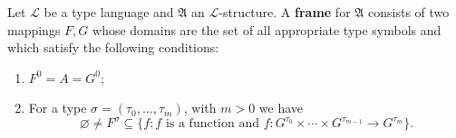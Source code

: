 Let $\mathcal{L}$ be a type language and $\mathfrak{A}$ an $\mathcal{L}$-structure. A \textbf{frame} for $\mathfrak{A}$ consists of two mappings $F, G$ whose domains are the set of all appropriate type symbols and which satisfy the following conditions:

\begin{enumerate}
\item[(16)] $F^0 = A = G^0$;
\item[(17)] For a type $\sigma = (\tau_0, \ldots, \tau_m)$, with $m > 0$ we have
  $$\varnothing \neq F^\sigma \subseteq \{f : f \text{ is a function and } f : G^{\tau_0} \times \cdots \times G^{\tau_{m-1}} \to G^{\tau_m}\}.$$
\end{enumerate}
